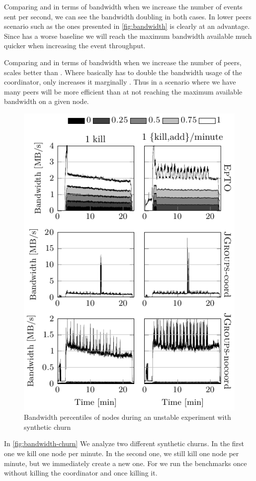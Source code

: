 Comparing \epto and \jgroups in terms of bandwidth when we increase the number of events sent per second, we can see the bandwidth doubling in both cases. In lower peers scenario such as the ones presented in \autoref{fig:bandwidth} \jgroups is clearly at an advantage. Since \epto has a worse baseline we will reach the maximum bandwidth available much quicker when increasing the event throughput.

Comparing \epto and \jgroups in terms of bandwidth when we increase the number of peers, \epto scales better than \jgroups. Where \jgroups basically has to double the bandwidth usage of the coordinator, \epto only increases it marginally . Thus in a scenario where we have many peers \epto will be more efficient than \jgroups at not reaching the maximum available bandwidth on a given node.
 \begin{figure}[hpt]
 	\centering
 	\includegraphics[width=\linewidth]{figures/bandwidth-synth-churn.pdf}
 	\vspace{-2mm} 
 	\caption{Bandwidth percentiles of nodes during an unstable experiment with synthetic churn}
 	\vspace{-2mm} 
 	\label{fig:bandwidth-churn}
 \end{figure}
\par
In \autoref{fig:bandwidth-churn} We analyze two different synthetic churns. In the first one we kill one node per minute. In the second one, we still kill one node per minute, but we immediately create a new one. For \jgroups we run the benchmarks once without killing the coordinator and once killing it.

